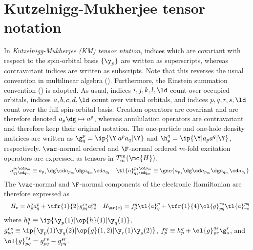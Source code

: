 \documentclass[11pt,fleqn]{article}
\numberwithin{equation}{section}
\begin{document}
\section{Kutzelnigg-Mukherjee tensor notation}

\begin{ntt}
In \textit{Kutzelnigg-Mukherjee (KM) tensor ntation}, indices which are covariant with respect to the spin-orbital basis $\{\y_p\}$ are written as superscripts, whereas contravariant indices are written as subscripts.
Note that this reverses the usual convention in multilinear algebra ().
Furthermore, the Einstein summation convention () is adopted.
As usual, indices $i,j,k,l,\ld$ count over occupied orbitals, indices $a,b,c,d,\ld$ count over virtual orbitals, and indices $p,q,r,s,\ld$ count over the full spin-orbital basis.
Creation operators are covariant and are therefore denoted $a_p\dg \mapsto a^p$, whereas annihilation operators are contravariant and therefore keep their original notation.
The one-particle and one-hole density matrices are written as $\g_q^p=\ip{\Y|a^pa_q|\Y}$ and $\h_p^q=\ip{\Y|a_pa^q|\Y}$, respectively.
$\vac$-normal ordered and $\F$-normal ordered $m$-fold excitation operators are expressed as tensors in $T_m^m(\mc{H})$.
\begin{align}
&&
  a^{p_1\cd p_m}_{q_1\cd q_m}
\equiv
  a_{p_1}\dg \cd a_{p_m}\dg a_{q_m}\cd a_{q_1}
&&
  \tl{a}^{p_1\cd p_m}_{q_1\cd q_m}
\equiv
  \gno{a_{p_1}\dg \cd a_{p_m}\dg a_{q_m}\cd a_{q_1}}
\end{align}
The $\vac$-normal and $\F$-normal components of the electronic Hamiltonian are therefore expressed as
\begin{align}
&&
  H_e
=
  h_p^q
  a^p_q
+
  \tfr{1}{2}
  g_{pq}^{rs}
  a^{pq}_{rs}
&&
  H_\mr{c}
=
  f_p^q
  \tl{a}^p_q
+
  \tfr{1}{4}
  \ol{g}_{pq}^{rs}
  \tl{a}^{pq}_{rs}
\end{align}
where $h_p^q\equiv\ip{\y_p(1)|\op{h}(1)|\y_q(1)}$, $g_{pq}^{rs}\equiv\ip{\y_p(1)\y_q(2)|\op{g}(1,2)|\y_r(1)\y_s(2)}$, $f_p^q\equiv h_p^q+\ol{g}_{pr}^{qs}\g^r_s$, and $\ol{g}_{pq}^{rs}=g_{pq}^{rs}-g_{pq}^{sr}$.
\end{ntt}
\end{document}
